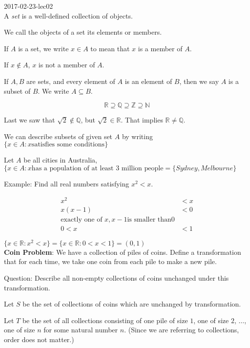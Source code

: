 \documentclass[a4paper, 11pt, twoside]{article}
\begin{document}
2017-02-23-lec02
\\

A \textit{set} is a well-defined collection of objects.

We call the objects of a set its elements or members.

If $A$ is a set, we write $x\in A$ to mean that $x$ is a member of $A$.

If $x \not\in A$, $x$ is not a member of $A$.

If $A, B$ are sets, and every element of $A$ is an element of $B$, then we say $A$ is a subset of $B$. We write $A \subseteq B$.

\[ 	\mathbb{R} \supseteq
	\mathbb{Q} \supseteq
	\mathbb{Z} \supseteq
	\mathbb{N} \]
	
Last we saw that $\sqrt{2} \not\in \mathbb{Q}$, but $\sqrt{2}\in \mathbb{R}$. That implies $\mathbb{R} \not= \mathbb{Q}$.

We can describe subsets of given set $A$ by writing $\{x\in A: x \text{satisfies some conditions}\}$

Let $A$ be all cities in Australia, $\{x \in A: x \text{has a population of at least 3 million people} = \{Sydney, Melbourne\}$

Example: Find all real numbers satisfying $x^2 < x$.

\[
\begin{split}
	x^2 &< x \\
	x(x-1) &< 0 \\
	\text{exactly one of } x, x-1 \text{is smaller than}   0\\
	0 < x &< 1
\end{split}
\]

$\{x \in \mathbb{R}: x^2<x\}=\{x\in \mathbb{R}: 0<x<1\} = (0,1)$
\\

\textbf{Coin Problem}: We have a collection of piles of coins. Define a transformation that for each time, we take one coin from each pile to make a new pile.

Question: Describe all non-empty collections of coins unchanged under this transformation.

Let $S$ be the set of collections of coins which are unchanged by transformation.

Let $T$ be the set of all collections consisting of one pile of size $1$, one of size $2$, $\dots$, one of size $n$ for some natural number $n$. (Since we are referring to collections, order does not matter.)
\\
\end{document}
